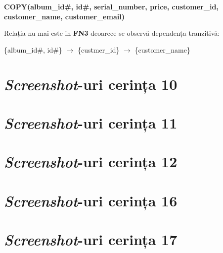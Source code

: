 \documentclass[a4paper, oneside, 12pt]{article}
\begin{document}
\begin{m_itemize}[after=]
        \item \textbf{COPY(album\_id\#, id\#, serial\_number, price, customer\_id, customer\_name, customer\_email)}
\end{m_itemize}

Relația nu mai este in \textbf{FN3} deoarece se observă dependența tranzitivă:
\begin{m_itemize}
\item \{album\_id\#, id\#\} $\rightarrow$ \{custmer\_id\} $\rightarrow$ \{customer\_name\}
\end{m_itemize}

\newpage

\appendix
\section{\emph{Screenshot}-uri cerința 10}
\label{screengenins}

\section{\emph{Screenshot}-uri cerința 11}
\section{\emph{Screenshot}-uri cerința 12}
\section{\emph{Screenshot}-uri cerința 16}
\section{\emph{Screenshot}-uri cerința 17}
\end{document}

